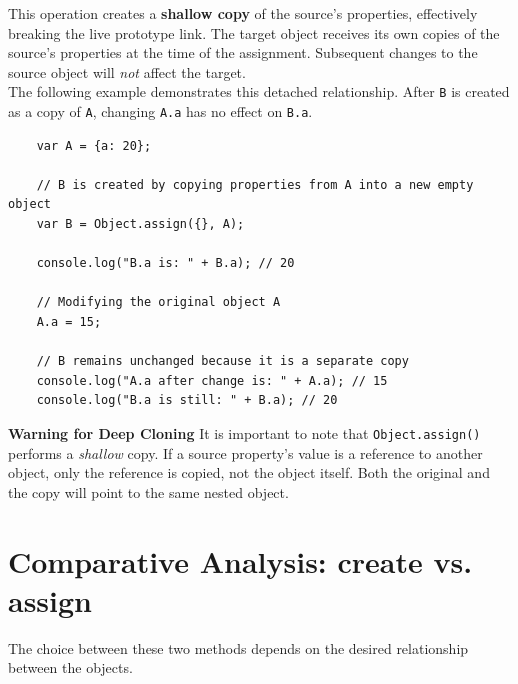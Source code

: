 \documentclass{scrbook}
\begin{document}
This operation creates a \textbf{shallow copy} of the source's properties, effectively breaking the live prototype link. The target object receives its own copies of the source's properties at the time of the assignment. Subsequent changes to the source object will \textit{not} affect the target. \\

The following example demonstrates this detached relationship. After \texttt{B} is created as a copy of \texttt{A}, changing \texttt{A.a} has no effect on \texttt{B.a}.

\begin{lstlisting}
    var A = {a: 20};
    
    // B is created by copying properties from A into a new empty object
    var B = Object.assign({}, A);
    
    console.log("B.a is: " + B.a); // 20
    
    // Modifying the original object A
    A.a = 15;
    
    // B remains unchanged because it is a separate copy
    console.log("A.a after change is: " + A.a); // 15
    console.log("B.a is still: " + B.a); // 20
\end{lstlisting}

\textbf{Warning for Deep Cloning} It is important to note that \texttt{Object.assign()} performs a \textit{shallow} copy. If a source property's value is a reference to another object, only the reference is copied, not the object itself. Both the original and the copy will point to the same nested object.

\section{Comparative Analysis: create vs. assign}

The choice between these two methods depends on the desired relationship between the objects.
\end{document}
